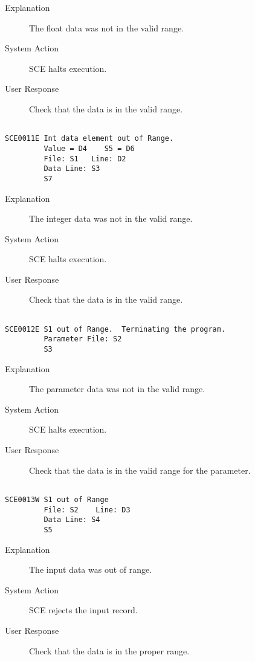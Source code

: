 \begin{description}
\item[Explanation]  The float data was not in the valid range.

\item[System Action]  SCE halts execution.

\item[User Response]  Check that the data is in the valid range.
\end{description}
\hrulefill
\begin{verbatim}

SCE0011E Int data element out of Range.
         Value = D4    S5 = D6
         File: S1   Line: D2
         Data Line: S3
         S7
\end{verbatim}
\begin{description}
\item[Explanation]  The integer data was not in the valid range.

\item[System Action]  SCE halts execution.

\item[User Response]  Check that the data is in the valid range.
\end{description}
\hrulefill
\begin{verbatim}

SCE0012E S1 out of Range.  Terminating the program.
         Parameter File: S2
         S3
\end{verbatim}
\begin{description}
\item[Explanation]  The parameter data was not in the valid range.

\item[System Action]  SCE halts execution.

\item[User Response]  Check that the data is in the valid range for the parameter.
\end{description}
\hrulefill
\begin{verbatim}

SCE0013W S1 out of Range
         File: S2    Line: D3
         Data Line: S4
         S5
\end{verbatim}
\begin{description}
\item[Explanation]  The input data was out of range.

\item[System Action]  SCE rejects the input record.

\item[User Response]  Check that the data is in the proper range.
\end{description}
